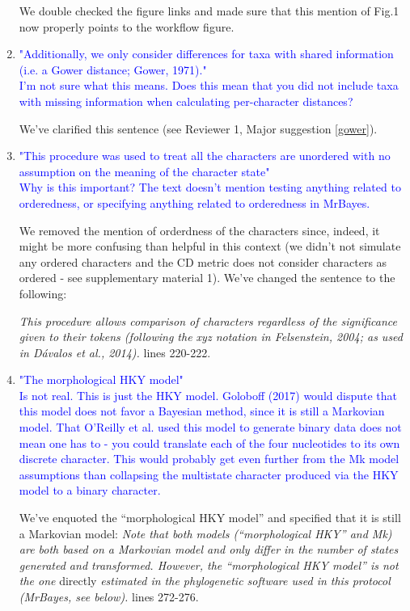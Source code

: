 \documentclass[12pt,letterpaper]{article}
\begin{document}
\begin{enumerate}
We double checked the figure links and made sure that this mention of Fig.1 now properly points to the workflow figure.

\item{\textcolor{blue}{"Additionally, we only consider differences for taxa with shared information (i.e. a Gower distance; Gower, 1971)."\\
I'm not sure what this means. Does this mean that you did not include taxa with missing information when calculating per-character distances?}}

We've clarified this sentence (see Reviewer 1, Major suggestion \ref{gower}).

\item{\textcolor{blue}{"This procedure was used to treat all the characters are unordered with no assumption on the meaning of the character state"\\
Why is this important? The text doesn't mention testing anything related to orderedness, or specifying anything related to orderedness in MrBayes.}}

We removed the mention of orderdness of the characters since, indeed, it might be more confusing than helpful in this context (we didn't not simulate any ordered characters and the CD metric does not consider characters as ordered - see supplementary material 1). We've changed the sentence to the following:

\textit{This procedure allows comparison of characters regardless of the significance given to their tokens (following the \textit{xyz} notation in Felsenstein, 2004; as used in D\'{a}valos et al., 2014).} lines 220-222.

\item{\textcolor{blue}{"The morphological HKY model"\\
Is not real. This is just the HKY model. Goloboff (2017) would dispute that this model does not favor a Bayesian method, since it is still a Markovian model. That O'Reilly et al. used this model to generate binary data does not mean one has to - you could translate each of the four nucleotides to its own discrete character. This would probably get even further from the Mk model assumptions than collapsing the multistate character produced via the HKY model to a binary character.}}

We've enquoted the ``morphological HKY model'' and specified that it is still a Markovian model:
\textit{Note that both models (``morphological HKY'' and Mk) are both based on a Markovian model and only differ in the number of states generated and transformed.
However, the ``morphological HKY model'' is not the one} directly \textit{estimated in the phylogenetic software used in this protocol (MrBayes, see below).} lines 272-276.


\end{enumerate}
\end{document}
